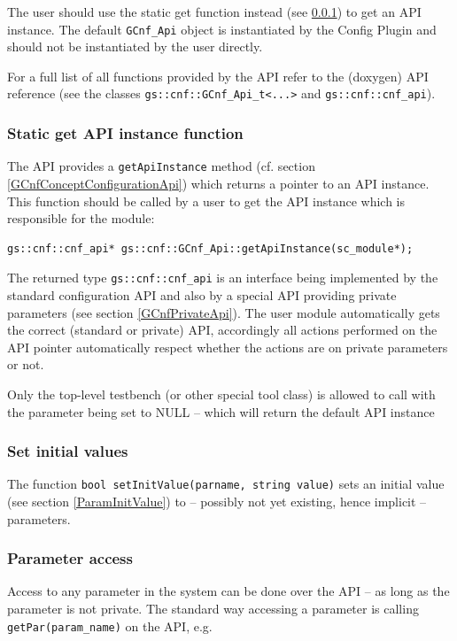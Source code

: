 The user should use the  static get function instead (see \ref{StaticGetAPIinstance}) to get an API instance. The default \lstinline|GCnf_Api| object is instantiated by the Config Plugin and should not be instantiated by the user directly.

For a full list of all functions provided by the \GreenConfig API refer to the (doxygen) API reference (see the classes \lstinline|gs::cnf::GCnf_Api_t<...>| and \lstinline|gs::cnf::cnf_api|).

\subsubsection{Static get API instance function}
\label{StaticGetAPIinstance}
The \GreenConfig API provides a \lstinline|getApiInstance| method (cf. section \ref{GCnfConceptConfigurationApi}) which returns a pointer to an API instance. This function should be called by a user to get the API instance which is responsible for the module:

\begin{lstlisting}
gs::cnf::cnf_api* gs::cnf::GCnf_Api::getApiInstance(sc_module*);
\end{lstlisting}

The returned type \lstinline|gs::cnf::cnf_api| is an interface being implemented by the standard configuration API and also by a special API providing private parameters (see section \ref{GCnfPrivateApi}). The user module automatically gets the correct (standard or private) API, accordingly all actions performed on the API pointer automatically respect whether the actions are on private parameters or not.

Only the top-level testbench (or other special tool class) is allowed to call with the parameter being set to NULL -- which will return the default API instance

\subsubsection{Set initial values}
The function \lstinline|bool setInitValue(parname, string value)| sets an initial value (see section \ref{ParamInitValue}) to -- possibly not yet existing, hence implicit -- parameters.

\subsubsection{Parameter access}
Access to any parameter in the system can be done over the API -- as long as the parameter is not private. The standard way accessing a parameter is calling \lstinline|getPar(param_name)| on the API, e.g.

